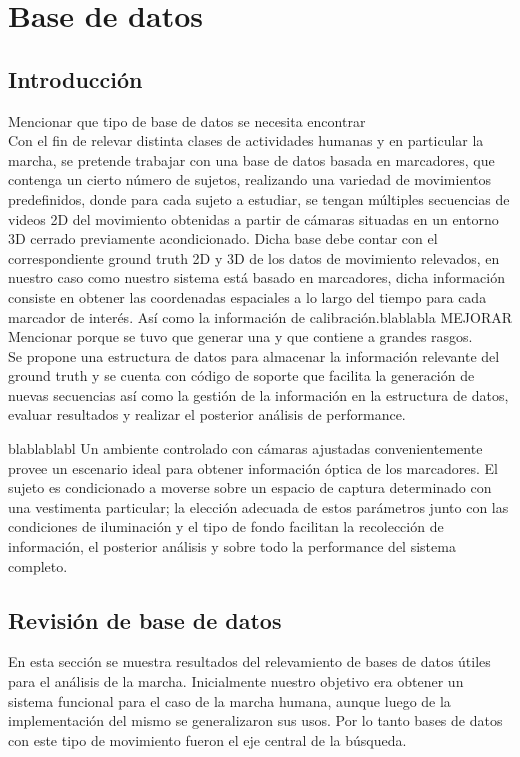 \section{Base de datos}


\subsection{Introducción}
\label{}
Mencionar que tipo de base de datos se necesita encontrar\\
Con el fin de relevar distinta clases de actividades humanas y en particular la marcha, se pretende trabajar con una base de datos basada en marcadores, que contenga un cierto número de sujetos, realizando una variedad de movimientos predefinidos, donde para cada sujeto a estudiar, se tengan múltiples secuencias de videos 2D del movimiento obtenidas a partir de cámaras situadas en un entorno 3D cerrado previamente acondicionado. Dicha base debe contar con el correspondiente ground truth 2D y 3D de los datos de movimiento relevados, en nuestro caso como nuestro sistema está basado en marcadores, dicha información consiste en obtener las coordenadas espaciales a lo largo del tiempo para cada marcador de interés. Así como la información de calibración.blablabla MEJORAR \\

Mencionar porque se tuvo que generar una y que contiene a grandes rasgos.\\
Se propone una estructura de datos para almacenar la información relevante del ground truth y  se cuenta con código de soporte que facilita la generación de nuevas secuencias así como la gestión de la información en la estructura de datos, evaluar resultados y realizar el  posterior análisis de performance.


blablablabl
Un ambiente controlado con cámaras ajustadas convenientemente provee un escenario ideal para obtener información óptica de los marcadores. El sujeto es condicionado a moverse sobre un espacio de captura determinado con una vestimenta particular; la elección adecuada de estos parámetros junto con las condiciones de iluminación y el tipo de fondo facilitan la recolección de información, el posterior análisis y sobre todo la performance del sistema completo.

\subsection{Revisión de base de datos}
\label{}
En esta sección se muestra  resultados del relevamiento de bases de datos útiles para el análisis de la marcha.
Inicialmente nuestro objetivo era obtener un sistema funcional para el caso de la marcha humana, aunque luego de la implementación del mismo se generalizaron sus usos. Por lo tanto bases de datos con este tipo de movimiento fueron el eje central de la búsqueda.

